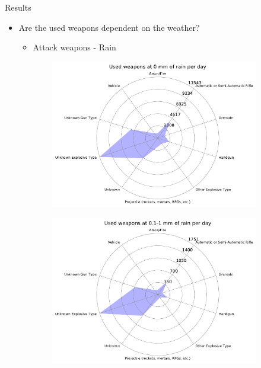 \documentclass{beamer}
\begin{document}
\begin{frame}{Results}
	\begin{itemize}
		\item 
		Are the used weapons dependent on the weather?
		\begin{itemize}
			\item Attack weapons - Rain
		\end{itemize}
	\end{itemize}
	
	\begin{figure}
		\begin{subfigure}[b]{0.3\textwidth}
			\includegraphics[width=\textwidth]{Rain-Weapon/rain0_starDiagram}
		\end{subfigure}
		\begin{subfigure}[b]{0.3\textwidth}
			\includegraphics[width=\textwidth]{Rain-Weapon/rain01-1_starDiagram}

\end{subfigure}
\end{figure}
\end{frame}
\end{document}
